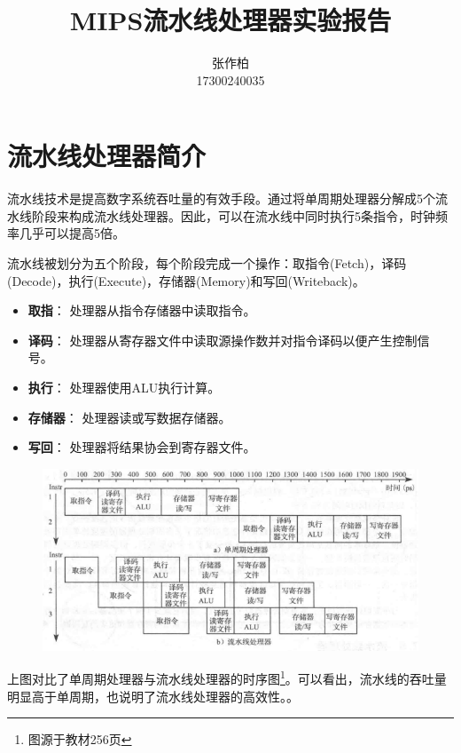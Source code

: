 \documentclass[12pt]{article} %
\title{\textbf{MIPS流水线处理器实验报告}}
\author{张作柏\\17300240035}
\begin{document}
\begin{sloppypar}
\maketitle

\pagestyle{fancy}
\lhead{\textbf{{\thetitle}}}
\rhead{\textbf{\nouppercase{\firstleftmark}}}
\cfoot{\thepage}

\thispagestyle{empty}
\tableofcontents
\clearpage

\setcounter{page}{1}

\section{流水线处理器简介}

流水线技术是提高数字系统吞吐量的有效手段。通过将单周期处理器分解成5个流水线阶段来构成流水线处理器。因此，可以在流水线中同时执行5条指令，时钟频率几乎可以提高5倍。

流水线被划分为五个阶段，每个阶段完成一个操作：取指令(Fetch)，译码(Decode)，执行(Execute)，存储器(Memory)和写回(Writeback)。
\begin{itemize}
\item {\bf 取指}： 处理器从指令存储器中读取指令。
\item {\bf 译码}： 处理器从寄存器文件中读取源操作数并对指令译码以便产生控制信号。
\item {\bf 执行}： 处理器使用ALU执行计算。
\item {\bf 存储器}： 处理器读或写数据存储器。
\item {\bf 写回}： 处理器将结果协会到寄存器文件。
\end{itemize}

\begin{figure}[h]
\centering
\includegraphics[width =0.95\linewidth]{figure/timestep.png}
\end{figure}

上图对比了单周期处理器与流水线处理器的时序图\footnote{图源于教材256页}。可以看出，流水线的吞吐量明显高于单周期，也说明了流水线处理器的高效性。。


\end{sloppypar}
\end{document}
